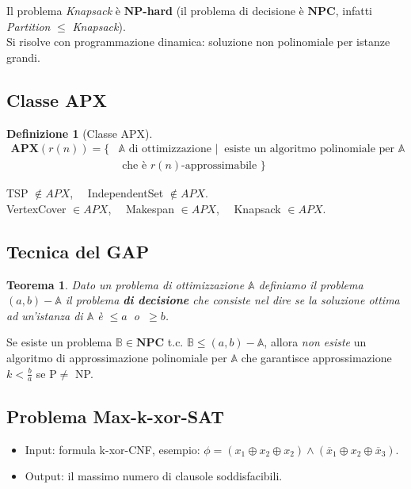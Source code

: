 \documentclass[a4paper]{article}
\newtheorem{thm}{Teorema}[subsection]
\theoremstyle{definition}
\newtheorem{definit}{Definizione}[subsection]
\newcommand{\np}{\mathbf{NP}}
\newcommand{\npc}{\mathbf{NPC}}
\newcommand{\apx}{\mathbf{APX}}
\newcommand{\prob}[1]{\mathbb{#1}}
\begin{document}
		\noindent
		Il problema \textit{Knapsack} è $\np$\textbf{-hard} (il problema di decisione è $\npc$, infatti \textit{Partition} $\leq$ \textit{Knapsack}).\\
		Si risolve con programmazione dinamica: soluzione non polinomiale per istanze grandi. 
		
		\subsection{Classe APX}
			\begin{definit}[Classe APX]
				\begin{align*}
					\apx(r(n)) = \big\lbrace & \prob{A} \text{ di ottimizzazione } \Big| \ \text{ esiste un algoritmo polinomiale per } \prob{A} \\
					& \text{ che è } r(n)\text{-approssimabile } \big\rbrace
				\end{align*}
			\end{definit}
		
		\noindent
		TSP $\notin APX$, ~~IndependentSet $\notin APX$.\\
		VertexCover $\in APX$, ~~Makespan $\in APX$, ~~Knapsack $\in APX$.
		
		\subsection{Tecnica del GAP}
			\begin{thm}
				Dato un problema di ottimizzazione $ \prob{A} $ definiamo il problema $ (a, b) - \prob{A} $ il problema \textbf{di decisione} che consiste nel dire se la soluzione ottima ad un'istanza di $ \prob{A} $ è $ \leq a \ $ o $ \ \geq b $.
			\end{thm}
		
		\noindent
		Se esiste un problema $\prob{B} \in \npc$ t.c. $\mathbb{B} \leq (a,b)-\prob{A}$, allora \textit{non esiste} un algoritmo di approssimazione polinomiale per $\prob{A}$ che garantisce approssimazione $k < \frac{b}{a}$ se P$\neq$ NP.
		
		\subsection{Problema Max-k-xor-SAT}
			\begin{itemize}
				\item Input: formula k-xor-CNF, esempio: $ \phi = (x_1 \oplus x_2\oplus x_2) \wedge (\overline{x}_1 \oplus x_2 \oplus \overline{x}_3) $.
				\item Output: il massimo numero di clausole soddisfacibili.
			\end{itemize}
		
\end{document}
